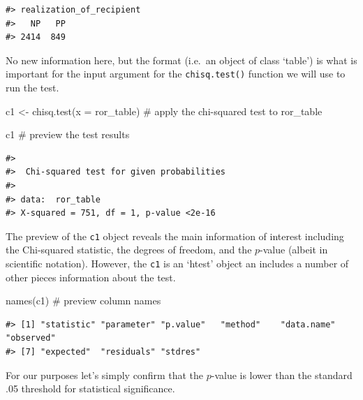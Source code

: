 \documentclass[
  letterpaper,
]{latex/krantz}
\newenvironment{Shaded}{\begin{snugshade}}{\end{snugshade}}
\newcommand{\AttributeTok}[1]{\textcolor[rgb]{0.40,0.45,0.13}{#1}}
\newcommand{\CommentTok}[1]{\textcolor[rgb]{0.37,0.37,0.37}{#1}}
\newcommand{\DecValTok}[1]{\textcolor[rgb]{0.68,0.00,0.00}{#1}}
\newcommand{\FunctionTok}[1]{\textcolor[rgb]{0.28,0.35,0.67}{#1}}
\newcommand{\NormalTok}[1]{\textcolor[rgb]{0.00,0.23,0.31}{#1}}
\newcommand{\OtherTok}[1]{\textcolor[rgb]{0.00,0.23,0.31}{#1}}
\newcommand{\SpecialCharTok}[1]{\textcolor[rgb]{0.37,0.37,0.37}{#1}}
\begin{document}
\begin{verbatim}
#> realization_of_recipient
#>   NP   PP 
#> 2414  849
\end{verbatim}

No new information here, but the format (i.e.~an object of class
`table') is what is important for the input argument for the
\texttt{chisq.test()} function we will use to run the test.

\begin{Shaded}
\begin{Highlighting}[]
\NormalTok{c1 }\OtherTok{\textless{}{-}} \FunctionTok{chisq.test}\NormalTok{(}\AttributeTok{x =}\NormalTok{ ror\_table) }\CommentTok{\# apply the chi{-}squared test to \textasciigrave{}ror\_table\textasciigrave{}}

\NormalTok{c1 }\CommentTok{\# preview the test results}
\end{Highlighting}
\end{Shaded}

\begin{verbatim}
#> 
#>  Chi-squared test for given probabilities
#> 
#> data:  ror_table
#> X-squared = 751, df = 1, p-value <2e-16
\end{verbatim}

The preview of the \texttt{c1} object reveals the main information of
interest including the Chi-squared statistic, the degrees of freedom,
and the \(p\)-value (albeit in scientific notation). However, the
\texttt{c1} is an `htest' object an includes a number of other pieces
information about the test.

\begin{Shaded}
\begin{Highlighting}[]
\FunctionTok{names}\NormalTok{(c1) }\CommentTok{\# preview column names}
\end{Highlighting}
\end{Shaded}

\begin{verbatim}
#> [1] "statistic" "parameter" "p.value"   "method"    "data.name" "observed" 
#> [7] "expected"  "residuals" "stdres"
\end{verbatim}

For our purposes let's simply confirm that the \(p\)-value is lower than
the standard .05 threshold for statistical significance.

\begin{Shaded}
\end{Shaded}
\end{document}

